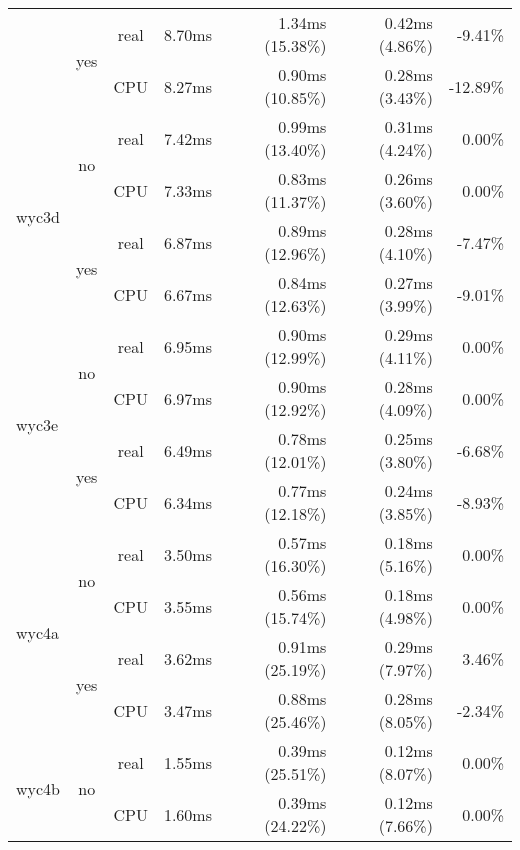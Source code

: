 \documentclass[en]{pracamgr}
\begin{document}
\begin{small}
\begin{longtable}{|l|c|c|r|r|r|r|}
                          \cline{2-7}
                          & \multirow{2}{*}{yes} & real & 8.70ms & 1.34ms (15.38\%) & 0.42ms (4.86\%) & -9.41\% \\*
                          &                      & CPU  & 8.27ms & 0.90ms (10.85\%) & 0.28ms (3.43\%) & -12.89\% \\
\hline
\multirow{4}{*}{wyc3d}    & \multirow{2}{*}{no}  & real & 7.42ms & 0.99ms (13.40\%) & 0.31ms (4.24\%) & 0.00\% \\*
                          &                      & CPU  & 7.33ms & 0.83ms (11.37\%) & 0.26ms (3.60\%) & 0.00\% \\*
                          \cline{2-7}
                          & \multirow{2}{*}{yes} & real & 6.87ms & 0.89ms (12.96\%) & 0.28ms (4.10\%) & -7.47\% \\*
                          &                      & CPU  & 6.67ms & 0.84ms (12.63\%) & 0.27ms (3.99\%) & -9.01\% \\
\hline
\multirow{4}{*}{wyc3e}    & \multirow{2}{*}{no}  & real & 6.95ms & 0.90ms (12.99\%) & 0.29ms (4.11\%) & 0.00\% \\*
                          &                      & CPU  & 6.97ms & 0.90ms (12.92\%) & 0.28ms (4.09\%) & 0.00\% \\*
                          \cline{2-7}
                          & \multirow{2}{*}{yes} & real & 6.49ms & 0.78ms (12.01\%) & 0.25ms (3.80\%) & -6.68\% \\*
                          &                      & CPU  & 6.34ms & 0.77ms (12.18\%) & 0.24ms (3.85\%) & -8.93\% \\
\hline
\multirow{4}{*}{wyc4a}    & \multirow{2}{*}{no}  & real & 3.50ms & 0.57ms (16.30\%) & 0.18ms (5.16\%) & 0.00\% \\*
                          &                      & CPU  & 3.55ms & 0.56ms (15.74\%) & 0.18ms (4.98\%) & 0.00\% \\*
                          \cline{2-7}
                          & \multirow{2}{*}{yes} & real & 3.62ms & 0.91ms (25.19\%) & 0.29ms (7.97\%) & 3.46\% \\*
                          &                      & CPU  & 3.47ms & 0.88ms (25.46\%) & 0.28ms (8.05\%) & -2.34\% \\
\hline
\multirow{4}{*}{wyc4b}    & \multirow{2}{*}{no}  & real & 1.55ms & 0.39ms (25.51\%) & 0.12ms (8.07\%) & 0.00\% \\*
                          &                      & CPU  & 1.60ms & 0.39ms (24.22\%) & 0.12ms (7.66\%) & 0.00\% \\*

\end{longtable}
\end{small}
\end{document}
